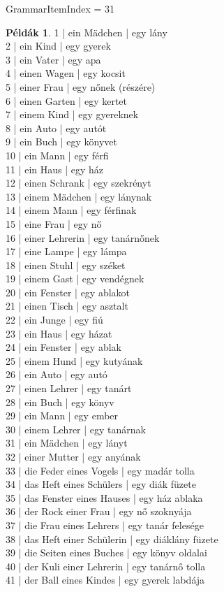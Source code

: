 \documentclass{article}
\theoremstyle{definition}
\newtheorem*{exmp}{Példák}
\begin{document}
GrammarItemIndex = 31

\begin{exmp}	%
1 | ein Mädchen | egy lány\\
2 | ein Kind | egy gyerek\\
3 | ein Vater | egy apa\\
4 | einen Wagen | egy kocsit\\
5 | einer Frau | egy nőnek (részére)\\
6 | einen Garten | egy kertet\\
7 | einem Kind | egy gyereknek\\
8 | ein Auto | egy autót\\
9 | ein Buch | egy könyvet\\
10 | ein Mann | egy férfi\\
11 | ein Haus | egy ház\\
12 | einen Schrank | egy szekrényt\\
13 | einem Mädchen | egy lánynak\\
14 | einem Mann | egy férfinak\\
15 | eine Frau | egy nő\\
16 | einer Lehrerin | egy tanárnőnek\\
17 | eine Lampe | egy lámpa\\
18 | einen Stuhl | egy széket\\
19 | einem Gast | egy vendégnek\\
20 | ein Fenster | egy ablakot\\
21 | einen Tisch | egy asztalt\\
22 | ein Junge | egy fiú\\
23 | ein Haus | egy házat\\
24 | ein Fenster | egy ablak\\
25 | einem Hund | egy kutyának\\
26 | ein Auto | egy autó\\
27 | einen Lehrer | egy tanárt\\
28 | ein Buch | egy könyv\\
29 | ein Mann | egy ember\\
30 | einem Lehrer | egy tanárnak\\
31 | ein Mädchen | egy lányt\\
32 | einer Mutter | egy anyának\\
33 | die Feder eines Vogels | egy madár tolla\\
34 | das Heft eines Schülers | egy diák füzete\\
35 | das Fenster eines Hauses | egy ház ablaka\\
36 | der Rock einer Frau | egy nő szoknyája\\
37 | die Frau eines Lehrers | egy tanár felesége\\
38 | das Heft einer Schülerin | egy diáklány füzete\\
39 | die Seiten eines Buches | egy könyv oldalai\\
40 | der Kuli einer Lehrerin | egy tanárnő tolla\\
41 | der Ball eines Kindes | egy gyerek labdája\\
\end{exmp}
\end{document}
